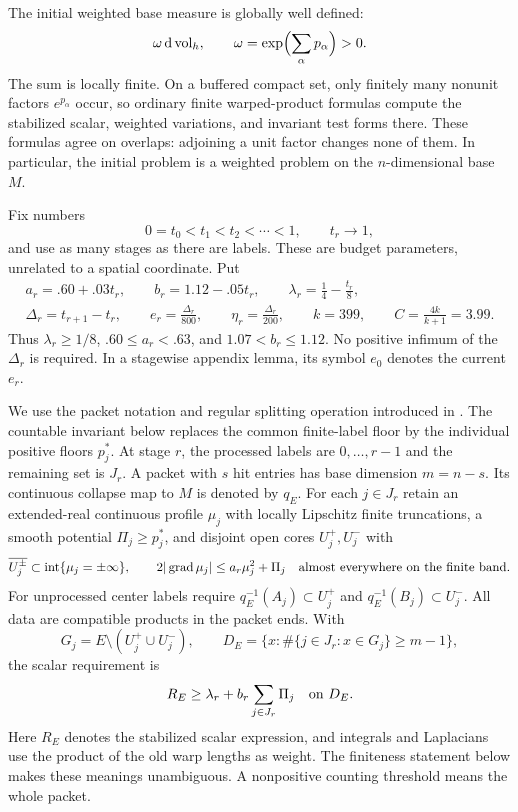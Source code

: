 \documentclass[11pt]{article}
\numberwithin{equation}{section}
\theoremstyle{definition}
\theoremstyle{remark}
\begin{document}
The initial weighted base measure is globally well defined:
\[
 \omega\,\mathrm d\operatorname{vol}_h,\qquad
 \omega=\exp\Bigl(\sum_\alpha p_\alpha\Bigr)>0.
\]
The sum is locally finite. On a buffered compact set, only finitely many
nonunit factors $e^{p_\alpha}$ occur, so ordinary finite warped-product
formulas compute the stabilized scalar, weighted variations, and
invariant test forms there. These formulas agree on overlaps: adjoining
a unit factor changes none of them. In particular, the initial problem
is a weighted problem on the $n$-dimensional base $M$.

Fix numbers
\[
 0=t_0<t_1<t_2<\cdots<1,\qquad t_r\longrightarrow1,
\]
and use as many stages as there are labels. These are budget parameters,
unrelated to a spatial coordinate. Put
\begin{equation}\label{countable:constants}
 \begin{gathered}
 a_r=.60+.03t_r,\qquad b_r=1.12-.05t_r,
 \qquad \lambda_r=\frac14-\frac{t_r}{8},\\
 \Delta_r=t_{r+1}-t_r,\qquad
 e_r=\frac{\Delta_r}{800},\qquad
 \eta_r=\frac{\Delta_r}{200},\qquad k=399,
 \qquad C=\frac{4k}{k+1}=3.99.
 \end{gathered}
\end{equation}
Thus $\lambda_r\ge1/8$, $.60\le a_r<.63$, and
$1.07<b_r\le1.12$. No positive infimum of the $\Delta_r$ is required. In a stagewise
appendix lemma, its symbol $e_0$ denotes the current $e_r$.

We use the packet notation and regular splitting operation introduced in
. The countable invariant below replaces the common
finite-label floor by the individual positive floors $p_j^*$.
At stage $r$, the processed labels are $0,\ldots,r-1$ and the remaining
set is $J_r$. A packet with $s$ hit entries has base dimension $m=n-s$.
Its continuous collapse map to $M$ is denoted by $q_E$. For each
$j\in J_r$ retain an extended-real continuous profile $\mu_j$ with
locally Lipschitz finite truncations, a smooth potential
$\Pi_j\ge p_j^*$, and disjoint open cores $U_j^+,U_j^-$ with
\begin{equation}\label{countable:profile-invariant}
 \overline{U_j^\pm}\subset\operatorname{int}\{\mu_j=\pm\infty\},
 \qquad 2|\operatorname{grad}\mu_j|\le a_r\mu_j^2+\Pi_j
 \quad\hbox{almost everywhere on the finite band}.
\end{equation}
For unprocessed center labels require
$q_E^{-1}(A_j)\subset U_j^+$ and $q_E^{-1}(B_j)\subset U_j^-$.
All data are compatible products in the packet ends. With
\begin{equation}\label{countable:required}
 G_j=E\setminus(U_j^+\cup U_j^-),\qquad
 D_E=\{x:\#\{j\in J_r:x\in G_j\}\ge m-1\},
\end{equation}
the scalar requirement is
\begin{equation}\label{countable:scalar-invariant}
 R_E\ge\lambda_r+b_r\sum_{j\in J_r}\Pi_j\quad\hbox{on }D_E.
\end{equation}
Here $R_E$ denotes the stabilized scalar expression, and integrals and
Laplacians use the product of the old warp lengths as weight. The
finiteness statement below makes these meanings unambiguous. A nonpositive
counting threshold means the whole packet.
\end{document}

